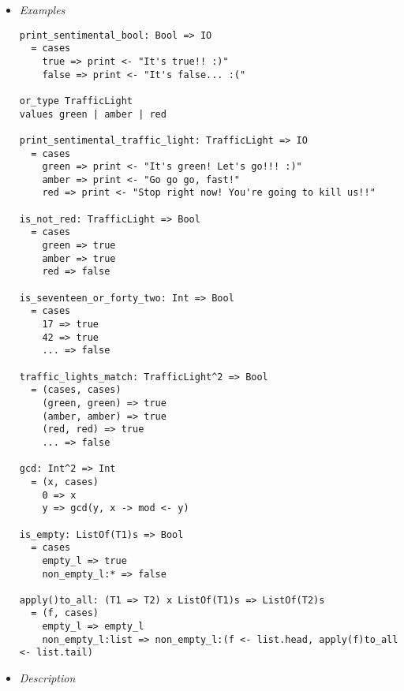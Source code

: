 \documentclass{article}
\begin{document}
\begin{itemize}
\item \textit{Examples}

\begin{verbatim}
print_sentimental_bool: Bool => IO
  = cases
    true => print <- "It's true!! :)"
    false => print <- "It's false... :("

or_type TrafficLight
values green | amber | red

print_sentimental_traffic_light: TrafficLight => IO
  = cases
    green => print <- "It's green! Let's go!!! :)"
    amber => print <- "Go go go, fast!"
    red => print <- "Stop right now! You're going to kill us!!"

is_not_red: TrafficLight => Bool
  = cases
    green => true
    amber => true
    red => false

is_seventeen_or_forty_two: Int => Bool
  = cases
    17 => true
    42 => true
    ... => false

traffic_lights_match: TrafficLight^2 => Bool
  = (cases, cases)
    (green, green) => true
    (amber, amber) => true
    (red, red) => true
    ... => false

gcd: Int^2 => Int
  = (x, cases)
    0 => x
    y => gcd(y, x -> mod <- y) 

is_empty: ListOf(T1)s => Bool
  = cases
    empty_l => true
    non_empty_l:* => false

apply()to_all: (T1 => T2) x ListOf(T1)s => ListOf(T2)s
  = (f, cases)
    empty_l => empty_l
    non_empty_l:list => non_empty_l:(f <- list.head, apply(f)to_all <- list.tail)

\end{verbatim}

\newpage

\item \textit{Description}


\end{itemize}
\end{document}

